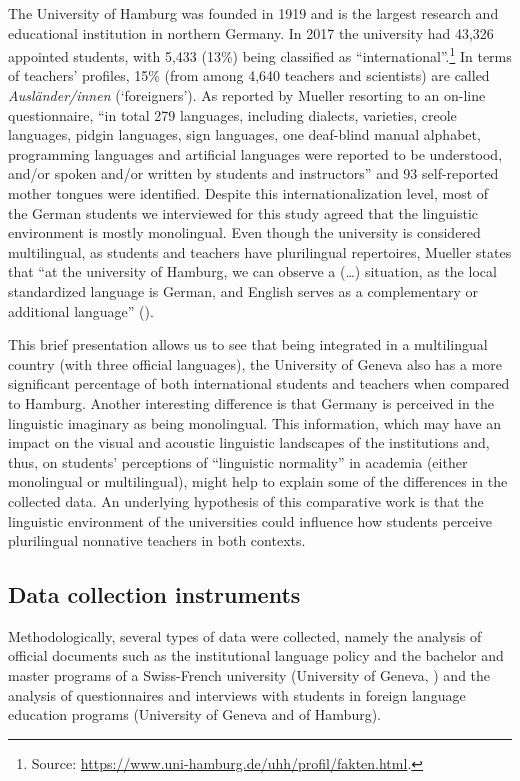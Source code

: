 \documentclass[output=paper]{../langscibook}
\begin{document}
The University of Hamburg was founded in 1919 and is the largest research and educational institution in northern Germany. In 2017 the university had 43,326 appointed students, with 5,433 (13\%) being classified as “international”.\footnote{Source: \url{https://www.uni-hamburg.de/uhh/profil/fakten.html}.}  In terms of teachers’ profiles, 15\% (from among 4,640 teachers and scientists) are called \emph{Ausländer/innen} (`foreigners'). As reported by Mueller resorting to an on-line questionnaire, “in total 279 languages, including dialects, varieties, creole languages, pidgin languages, sign languages, one deaf-blind manual alphabet, programming languages and artificial languages were reported to be understood, and/or spoken and/or written by students and instructors” \citep[366]{Mueller2018} and 93 self-reported mother tongues were identified. Despite this internationalization level, most of the German students we interviewed for this study agreed that the linguistic environment is mostly monolingual. Even though the university is considered multilingual, as students and teachers have plurilingual repertoires, Mueller states that “at the university of Hamburg, we can observe a (…) situation, as the local standardized language is German, and English serves as a complementary or additional language” (\citeyear[361]{Mueller2018}).

This brief presentation allows us to see that being integrated in a multilingual country (with three official languages), the University of Geneva also has a more significant percentage of both international students and teachers when compared to Hamburg. Another interesting difference is that Germany is perceived in the linguistic imaginary as being monolingual. This information, which may have an impact on the visual and acoustic linguistic landscapes of the institutions and, thus, on students’ perceptions of “linguistic normality” in academia (either monolingual or multilingual), might help to explain some of the differences in the collected data. An underlying hypothesis of this comparative work is that the linguistic environment of the universities could influence how students perceive plurilingual nonnative teachers in both contexts. 

\subsection{Data collection instruments}
Methodologically, several types of data were collected, namely the analysis of official documents such as the institutional language policy and the bachelor and master programs of a Swiss-French university (University of Geneva, \citealt{Yanaprasart2020}) and the analysis of questionnaires and interviews with students in foreign language education programs (University of Geneva and of Hamburg). 
\end{document}
